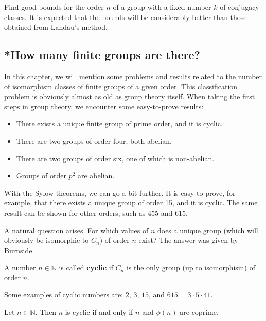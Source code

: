 
\begin{problem}[Brauer]
Find good bounds for the order $n$ of a group with a fixed number $k$ of conjugacy classes. It is expected that the bounds will be considerably better than those obtained from Landau's method.
\end{problem}

\subsection{*How many finite groups are there?}
\label{cantidad}

In this chapter, we will mention some problems and results related to the number of isomorphism classes of finite groups of a given order. This classification problem is obviously almost as old as group theory itself. When taking the first steps in group theory, we encounter some easy-to-prove results:
\begin{itemize}
    \item There exists a unique finite group of prime order, and it is cyclic.
    \item There are two groups of order four, both abelian.
    \item There are two groups of order six, one of which is non-abelian.
    \item Groups of order $p^2$ are abelian.
\end{itemize}

With the Sylow theorems, we can go a bit further. It is easy to prove, for example, that there exists a unique group of order 15, and it is cyclic. The same result can be shown for other orders, such as 455 and 615.

A natural question arises. For which values of $n$ does a unique group (which will obviously be isomorphic to $C_n$) of order $n$ exist? The answer was given by Burnside.

\begin{definition}
A number $n\in\mathbb{N}$ is called \textbf{cyclic} if $C_n$ is the only group (up to isomorphism) of order $n$.
\end{definition}

Some examples of cyclic numbers are: $2$, $3$, $15$, and $615=3\cdot 5\cdot 41$.

\begin{theorem}[Burnside]
    Let $n\in\mathbb{N}$. Then $n$ is cyclic if and only if $n$ and $\phi(n)$ are coprime.
\end{theorem}

